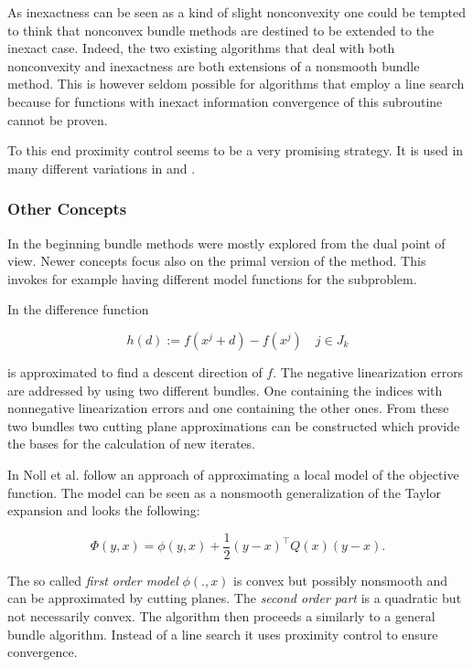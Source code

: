 As inexactness can be seen as a kind of slight nonconvexity one could be tempted to think that nonconvex bundle methods are destined to be extended to the inexact case. Indeed, the two existing algorithms \cite{Hare2016,Noll2013} that deal with both nonconvexity and inexactness are both extensions of a nonsmooth bundle method.
This is however seldom possible for algorithms that employ a line search because for functions with inexact information convergence of this subroutine cannot be proven.

To this end proximity control seems to be a very promising strategy. It is used in many different variations in \cite{Apkarian2008, Lewis2015, Noll2010, Noll2005, Noll2012} and \cite{Schramm1992}.

\subsubsection{Other Concepts}

In the beginning bundle methods were mostly explored from the  dual point of view. Newer concepts focus also on the primal version of the method. This invokes for example having different model functions for the subproblem.

In \cite{Fuduli2004, Fuduli2004a} the difference function 

\begin{equation*}
	h(d):= f(x^j +d) -f(x^j) \quad j \in J_k
\label{diff_fun}
\end{equation*}

is approximated to find a descent direction of \(f\).
The negative linearization errors are addressed by using two different bundles. One containing the indices with nonnegative linearization errors and one containing the other ones. From these two bundles two cutting plane approximations can be constructed which provide the bases for the calculation of new iterates.

In \cite{Noll2012} Noll et al. follow an approach of approximating a local model of the objective function. The model can be seen as a nonsmooth generalization of the Taylor expansion and looks the following:

\begin{equation*}
	\Phi(y,x) = \phi(y,x)+\frac{1}{2}(y-x)^{\top}Q(x)(y-x).
\label{quad_mod}
\end{equation*}

The so called \emph{first order model} \(\phi(.,x)\) is convex but possibly nonsmooth and can be approximated by cutting planes. The \emph{second order part} is a quadratic but not necessarily convex. The algorithm then proceeds a similarly to a general bundle algorithm.
Instead of a line search it uses proximity control to ensure convergence.

